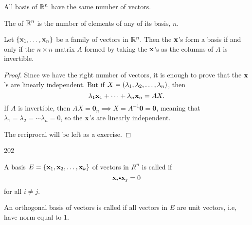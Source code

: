 \begin{thm}
 All basis of $\mathbb{R} ^n$ have the same number of vectors.
\end{thm}

\begin{df}
The  of $\mathbb{R} ^n$ is the number of elements of any of its basis, $n$.
\end{df}


\begin{thm}\label{thm:base_matrix_is_invertible}
Let $\{\mathbf{ x}_1, \ldots , \mathbf{ x}_n\}$ be a family of vectors in  $\mathbb{R}^n$. Then
the $\mathbf{ x}$'s form a basis if and only if the $n\times n$ matrix $A$
formed by taking the $\mathbf{ x}$'s as the columns of $A$ is invertible.
\end{thm}
\begin{proof}
Since we have the right number of vectors, it is enough to prove
that the $\mathbf{ x}$'s are linearly independent. But if $X =
\left( \lambda_1 , \lambda_2 , \dots , \lambda_n \right)$, then $$\lambda_1\mathbf{ x}_1 + \cdots
+ \lambda_n\mathbf{ x}_n = AX.
$$If $A$ is invertible, then $AX = {\mathbf 0}_n \implies X = A^{-1}{\mathbf 0} = {\mathbf
0}$, meaning that $\lambda_1 = \lambda_2 = \cdots \lambda_n = 0$, so the $\mathbf{ x}$'s
are linearly independent.

\bigskip
The reciprocal will be left as a  exercise.
\end{proof}



\begin{df} \mbox{}
\begin{dingautolist}{202}
 \item A basis  $E=\{\mathbf{ x}_1, \mathbf{ x}_2, \dots , \mathbf{ x}_k\}$  of vectors in $R^n$ is called   if 
        \[\vector{x}_i \bp \vector{x}_j  =  0\]
for all $i\neq j$. 
 \item  An orthogonal basis of vectors is called  if all vectors in $E$ are unit vectors, i.e, have norm equal to 1.

\end{dingautolist}


 
\end{df}



